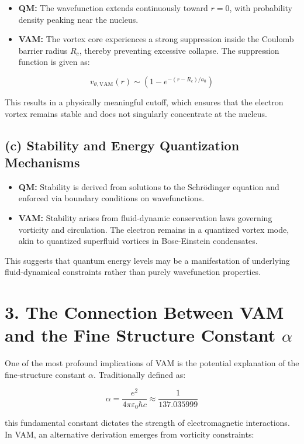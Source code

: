 \begin{itemize}
    \item \textbf{QM:} The wavefunction extends continuously toward \(r = 0\), with probability density peaking near the nucleus.
    \item \textbf{VAM:} The vortex core experiences a strong suppression inside the Coulomb barrier radius \(R_c\), thereby preventing excessive collapse. The suppression function is given as:
\end{itemize}

\[
    v_{\theta, \text{VAM}}(r) \sim \left(1 - e^{-(r - R_c)/a_0}\right)
\]

This results in a physically meaningful cutoff, which ensures that the electron vortex remains stable and does not singularly concentrate at the nucleus.

\subsection*{(c) Stability and Energy Quantization Mechanisms}

\begin{itemize}
    \item \textbf{QM:} Stability is derived from solutions to the Schrödinger equation and enforced via boundary conditions on wavefunctions.
    \item \textbf{VAM:} Stability arises from fluid-dynamic conservation laws governing vorticity and circulation. The electron remains in a quantized vortex mode, akin to quantized superfluid vortices in Bose-Einstein condensates.
\end{itemize}

This suggests that quantum energy levels may be a manifestation of underlying fluid-dynamical constraints rather than purely wavefunction properties.

\section*{3. The Connection Between VAM and the Fine Structure Constant \(\alpha\)}

One of the most profound implications of VAM is the potential explanation of the fine-structure constant \(\alpha\). Traditionally defined as:

\[
    \alpha = \frac{e^2}{4\pi \varepsilon_0 \hbar c} \approx \frac{1}{137.035999}
\]

this fundamental constant dictates the strength of electromagnetic interactions. In VAM, an alternative derivation emerges from vorticity constraints:

